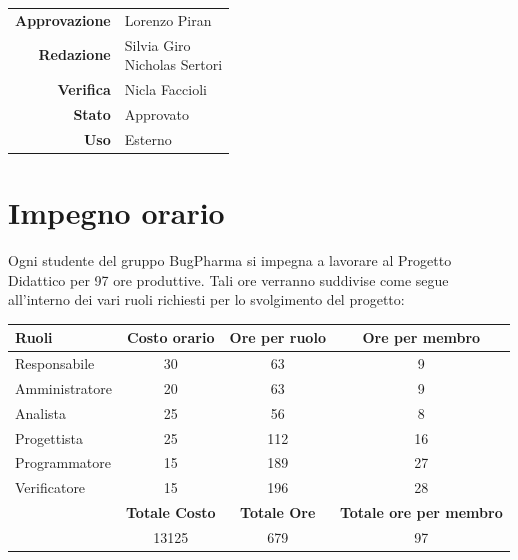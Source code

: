\documentclass[11pt]{article}
\begin{document}
\begin{titlepage}
\begin{center}
            \large
            
            
            \vfill
            
            \begin{tabular}{r|l}
                \textbf{Approvazione} &  Lorenzo Piran\\
                \textbf{Redazione} &  \parbox[t]{3.5cm}{Silvia Giro \\Nicholas Sertori }\\
                \textbf{Verifica} &  Nicla Faccioli\\
                \textbf{Stato} &  Approvato\\
                \textbf{Uso} & Esterno
            \end{tabular}
            \vfill
            
        \end{center}
    \end{titlepage}

\maketitle

\tableofcontents
\newpage

\section{Impegno orario}
Ogni studente del gruppo BugPharma si impegna a lavorare al Progetto Didattico per 97 ore produttive.
Tali ore verranno suddivise come segue all'interno dei vari ruoli richiesti per lo svolgimento del progetto: \\

\begin{tabular}{|l|c|c|c|}
\hline
\textbf{Ruoli} & \textbf{Costo orario} & \textbf{Ore per ruolo} & \textbf{Ore per membro}\\
\hline
Responsabile & 30 & 63 & 9\\
\hline
Amministratore & 20 & 63 & 9\\
\hline
Analista & 25 & 56 & 8 \\
\hline
Progettista & 25 & 112 & 16\\
\hline
Programmatore & 15 & 189 & 27\\
\hline
Verificatore & 15 & 196 & 28\\
\hline
            & \textbf{Totale Costo} & \textbf{Totale Ore} & \textbf{Totale ore per membro} \\
\hline
            & \cellcolor{green!25}13125 & 679 & 97 \\
\hline
\end{tabular}  \\
\end{document}
